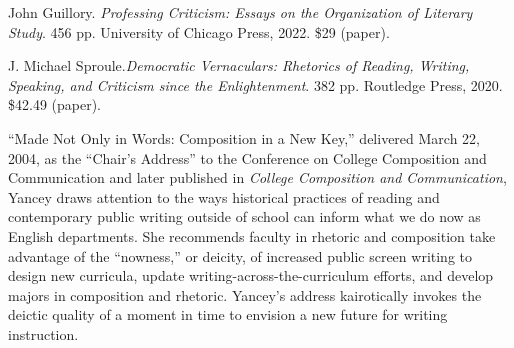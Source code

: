 \documentclass{tufte-handout}
\begin{document}
\begin{titlepage}
\begin{fullwidth}
\end{fullwidth}

\vspace*{1.3em}


\noindent John Guillory. \emph{Professing
Criticism: Essays on the Organization of Literary
Study}. 456 pp. University of Chicago Press, 2022.
\$29 (paper).

\vspace*{0.15 in}

\noindent J. Michael Sproule.\emph{Democratic
Vernaculars: Rhetorics of Reading, Writing, Speaking, and Criticism
since the Enlightenment}. 382 pp. Routledge Press,
2020. \$42.49 (paper).

\vspace*{0.2 in}

 ``Made Not Only in Words: Composition in a
New Key,'' delivered March 22, 2004, as the ``Chair's Address'' to the
Conference on College Composition and Communication and later published
in \emph{College Composition and Communication}, Yancey draws attention
to the ways historical practices of reading and contemporary public
writing outside of school can inform what we do now as English
departments. She recommends faculty in rhetoric and composition take
advantage of the ``nowness,'' or deicity, of increased public screen
writing to design new curricula, update writing-across-the-curriculum
efforts, and develop majors in composition and rhetoric. Yancey's
address kairotically invokes the deictic quality of a moment in time to
envision a new future for writing instruction.



\enlargethispage{2\baselineskip}

\vspace*{5em}



 \end{titlepage}

\end{document}
